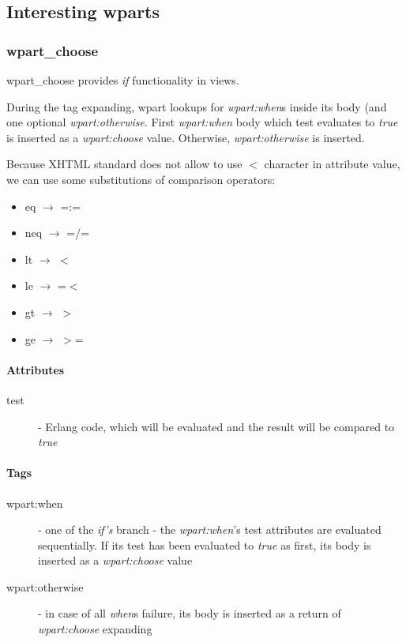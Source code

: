 \subsection{Interesting wparts}
\subsubsection{wpart\_choose} wpart\_choose provides {\it if} functionality in views. 

During the tag expanding, wpart lookups for {\it wpart:when}s inside its body (and one optional {\it wpart:otherwise}. First {\it wpart:when} body which test evaluates to {\it true} is inserted as a {\it wpart:choose} value. Otherwise, {\it wpart:otherwise} is inserted.

Because XHTML standard does not allow to use $<$ character in attribute value, we can use some substitutions of comparison operators:
\begin{itemize}
\item eq $\rightarrow$ =:=
\item neq $\rightarrow$ =/=
\item lt $\rightarrow$ $<$
\item le $\rightarrow$ =$<$
\item gt $\rightarrow$ $>$
\item ge $\rightarrow$ $>$=
\end{itemize}

\paragraph{Attributes}
\begin{description}
\item[test]- Erlang code, which will be evaluated and the result will be compared to {\it true}
\end{description}

\paragraph{Tags}
\begin{description}
\item[wpart:when]- one of the {\it if's} branch - the {\it wpart:when}'s test attributes are evaluated sequentially. If its test has been evaluated to {\it true} as first, its body is inserted as a {\it wpart:choose} value
\item[wpart:otherwise]- in case of all {\it when}s failure, its body is inserted as a return of {\it wpart:choose} expanding
\end{description}

